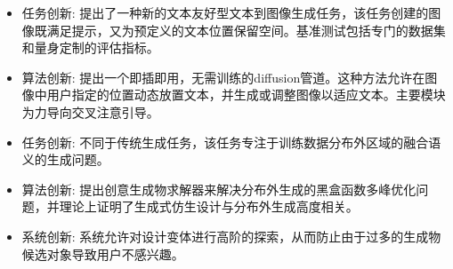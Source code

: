 \documentclass[UTF8,AutoFakeBold]{resume}
\begin{document}
    \begin{itemize}
    \item[\faThumbTack] \kaishu 任务创新: 提出了一种新的文本友好型文本到图像生成任务，该任务创建的图像既满足提示，又为预定义的文本位置保留空间。基准测试包括专门的数据集和量身定制的评估指标。
        \item[\faThumbTack] \kaishu 算法创新: 提出一个即插即用，无需训练的diffusion管道。这种方法允许在图像中用户指定的位置动态放置文本，并生成或调整图像以适应文本。主要模块为力导向交叉注意引导。
    \end{itemize}
    \begin{itemize}
    \item[\faThumbTack] \kaishu 任务创新: 不同于传统生成任务，该任务专注于训练数据分布外区域的融合语义的生成问题。
    \item[\faThumbTack] \kaishu 算法创新: 提出创意生成物求解器来解决分布外生成的黑盒函数多峰优化问题，并理论上证明了生成式仿生设计与分布外生成高度相关。
    \item[\faThumbTack] \kaishu 系统创新: 系统允许对设计变体进行高阶的探索，从而防止由于过多的生成物候选对象导致用户不感兴趣。
    \end{itemize}
\end{document}
